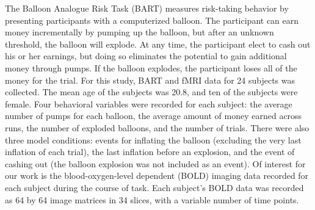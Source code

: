 \par \indent The Balloon Analogue Risk Task (BART) measures risk-taking behavior by presenting participants with a computerized balloon. The participant can earn money incrementally by pumping up the balloon, but after an unknown threshold, the balloon will explode. At any time, the participant elect to cash out his or her earnings, but doing so eliminates the potential to gain additional money through pumps. If the balloon explodes, the participant loses all of the money for the trial. For this study, BART and fMRI data for 24 subjects was collected. The mean age of the subjects was 20.8, and ten of the subjects were female. Four behavioral variables were recorded for each subject: the average number of pumps for each balloon, the average amount of money earned across runs, the number of exploded balloons, and the number of trials. There were also three model conditions: events for inflating the balloon (excluding the very last inflation of each trial), the last inflation before an explosion, and the event of cashing out (the balloon explosion was not included as an event). Of interest for our work is the blood-oxygen-level dependent (BOLD) imaging data recorded for each subject during the course of task. Each subject's BOLD data was recorded as 64 by 64 image matrices in 34 slices, with a variable number of time points. 

